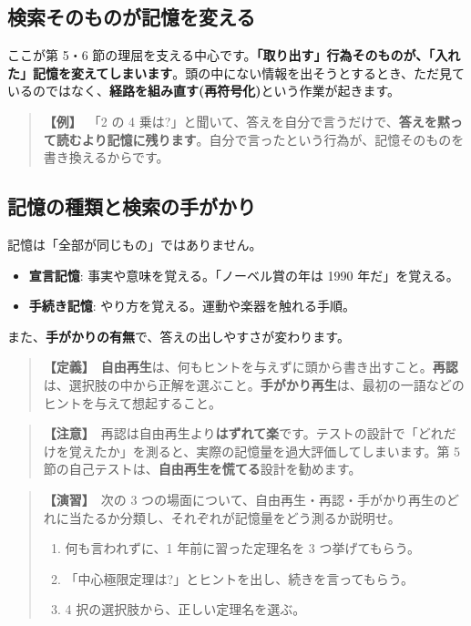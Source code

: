 \documentclass{article}
\begin{document}
\subsection{検索そのものが記憶を変える}

ここが第 5・6 節の理屈を支える中心です。\textbf{「取り出す」行為そのものが、「入れた」記憶を変えてしまいます}。頭の中にない情報を出そうとするとき、ただ見ているのではなく、\textbf{経路を組み直す(再符号化)}という作業が起きます。

\begin{quote}
\textbf{【例】}\ 「2 の 4 乗は?」と聞いて、答えを自分で言うだけで、\textbf{答えを黙って読むより記憶に残ります}。自分で言ったという行為が、記憶そのものを書き換えるからです。
\end{quote}

\subsection{記憶の種類と検索の手がかり}

記憶は「全部が同じもの」ではありません。

\begin{itemize}
\item \textbf{宣言記憶}: 事実や意味を覚える。「ノーベル賞の年は 1990 年だ」を覚える。
\item \textbf{手続き記憶}: やり方を覚える。運動や楽器を触れる手順。
\end{itemize}

また、\textbf{手がかりの有無}で、答えの出しやすさが変わります。

\begin{quote}
\textbf{【定義】}\ \textbf{自由再生}は、何もヒントを与えずに頭から書き出すこと。\textbf{再認}は、選択肢の中から正解を選ぶこと。\textbf{手がかり再生}は、最初の一語などのヒントを与えて想起すること。
\end{quote}

\begin{quote}
\textbf{【注意】}\ 再認は自由再生より\textbf{はずれて楽}です。テストの設計で「どれだけを覚えたか」を測ると、実際の記憶量を過大評価してしまいます。第 5 節の自己テストは、\textbf{自由再生を慌てる}設計を勧めます。
\end{quote}

\begin{quote}
\textbf{【演習】}\ 次の 3 つの場面について、自由再生・再認・手がかり再生のどれに当たるか分類し、それぞれが記憶量をどう測るか説明せ。
\begin{enumerate}
\item 何も言われずに、1 年前に習った定理名を 3 つ挙げてもらう。
\item 「中心極限定理は?」とヒントを出し、続きを言ってもらう。
\item 4 択の選択肢から、正しい定理名を選ぶ。
\end{enumerate}
\end{quote}
\end{document}
